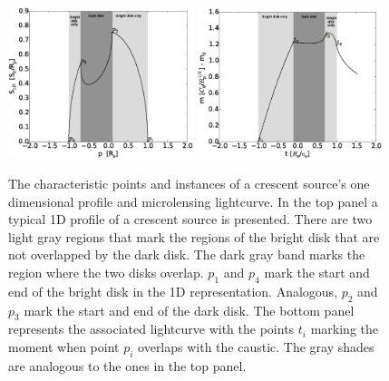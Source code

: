 \documentclass[usenatbib]{mn2e}
\begin{document}
\begin{figure}
\centering
        \includegraphics[width = 0.48\textwidth]{figures/ch_points.eps}
        \includegraphics[width = 0.48\textwidth]{figures/ch_instances.eps}
\caption{\label{fig:char_points} The characteristic points and instances
of a crescent source's one dimensional profile and microlensing lightcurve.
In the top panel a typical 1D profile  of a crescent source is presented.
There are two light gray regions that mark the regions of the bright disk
that are not overlapped by the dark disk. The dark gray band marks the
region where the two disks overlap. $p_1$ and $p_4$ mark the start and
end of the bright disk in the
1D representation. Analogous, $p_2$ and $p_3$ mark the start and
end of the dark disk.
The bottom panel represents the associated lightcurve with the points
$t_i$ marking the moment when point $p_i$ overlaps with the caustic.
The gray shades are analogous to the ones in the top panel.
 }
\end{figure}
\end{document}
